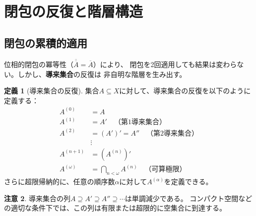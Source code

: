\documentclass[a4paper,12pt]{ltjsarticle}
\theoremstyle{definition}
\newtheorem{definition}{定義}[section]
\newtheorem{remark}[definition]{注意}
\begin{document}
\section{閉包の反復と階層構造}

\subsection{閉包の累積的適用}

位相的閉包の冪等性（$\overline{\overline{A}} = \overline{A}$）により、
閉包を2回適用しても結果は変わらない。しかし、\textbf{導来集合}の反復は
非自明な階層を生み出す。

\begin{definition}[導来集合の反復]\label{def:iterated-derived}
集合$A \subseteq X$に対して、導来集合の反復を以下のように定義する：
\begin{align*}
A^{(0)} &= A \\
A^{(1)} &= A' \quad \text{（第1導来集合）} \\
A^{(2)} &= (A')' = A'' \quad \text{（第2導来集合）} \\
&\vdots \\
A^{(n+1)} &= (A^{(n)})' \\
A^{(\omega)} &= \bigcap_{n < \omega} A^{(n)} \quad \text{（可算極限）}
\end{align*}
さらに超限帰納的に、任意の順序数$\alpha$に対して$A^{(\alpha)}$を定義できる。
\end{definition}

\begin{remark}
導来集合の列$A \supseteq A' \supseteq A'' \supseteq \cdots$は単調減少である。
コンパクト空間などの適切な条件下では、この列は有限または超限的に空集合に到達する。
\end{remark}
\end{document}
